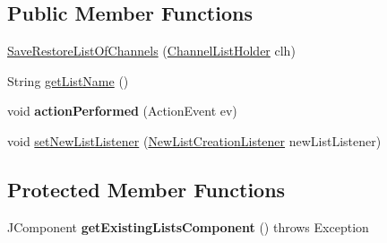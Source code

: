 \subsection*{Public Member Functions}
\begin{DoxyCompactItemize}
\item 
\hyperlink{classgov_1_1fnal_1_1ppd_1_1dd_1_1channel_1_1list_1_1SaveRestoreListOfChannels_ab8848e015a8234858b67d9e254d84a41}{Save\-Restore\-List\-Of\-Channels} (\hyperlink{interfacegov_1_1fnal_1_1ppd_1_1dd_1_1channel_1_1ChannelListHolder}{Channel\-List\-Holder} clh)
\item 
String \hyperlink{classgov_1_1fnal_1_1ppd_1_1dd_1_1channel_1_1list_1_1SaveRestoreListOfChannels_a54059a2b37d7784581a793ad84faee50}{get\-List\-Name} ()
\item 
\hypertarget{classgov_1_1fnal_1_1ppd_1_1dd_1_1channel_1_1list_1_1SaveRestoreListOfChannels_a3cf2f11c9d9a6a0241f2c676a182e2ee}{void {\bfseries action\-Performed} (Action\-Event ev)}\label{classgov_1_1fnal_1_1ppd_1_1dd_1_1channel_1_1list_1_1SaveRestoreListOfChannels_a3cf2f11c9d9a6a0241f2c676a182e2ee}

\item 
void \hyperlink{classgov_1_1fnal_1_1ppd_1_1dd_1_1channel_1_1list_1_1SaveRestoreListOfChannels_a8a041dd74a31fcf8084a680cd2458bbc}{set\-New\-List\-Listener} (\hyperlink{interfacegov_1_1fnal_1_1ppd_1_1dd_1_1channel_1_1list_1_1NewListCreationListener}{New\-List\-Creation\-Listener} new\-List\-Listener)
\end{DoxyCompactItemize}
\subsection*{Protected Member Functions}
\begin{DoxyCompactItemize}
\item 
\hypertarget{classgov_1_1fnal_1_1ppd_1_1dd_1_1channel_1_1list_1_1SaveRestoreListOfChannels_a972821afb1b54dfdbca27195608515dd}{J\-Component {\bfseries get\-Existing\-Lists\-Component} ()  throws Exception }\label{classgov_1_1fnal_1_1ppd_1_1dd_1_1channel_1_1list_1_1SaveRestoreListOfChannels_a972821afb1b54dfdbca27195608515dd}

\end{DoxyCompactItemize}
